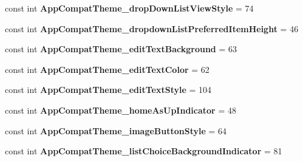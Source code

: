 \begin{DoxyCompactItemize}
\mbox{\label{class_sample_app_1_1_droid_1_1_resource_1_1_styleable_a871f78d9744c0ef783be14cd3319431d}} 
const int {\bfseries App\+Compat\+Theme\+\_\+drop\+Down\+List\+View\+Style} = 74
\item 
\mbox{\label{class_sample_app_1_1_droid_1_1_resource_1_1_styleable_aa779dd9c2f3264c4af6d77730baf8865}} 
const int {\bfseries App\+Compat\+Theme\+\_\+dropdown\+List\+Preferred\+Item\+Height} = 46
\item 
\mbox{\label{class_sample_app_1_1_droid_1_1_resource_1_1_styleable_a05c88570886a89a85a61f4e0fc1c652d}} 
const int {\bfseries App\+Compat\+Theme\+\_\+edit\+Text\+Background} = 63
\item 
\mbox{\label{class_sample_app_1_1_droid_1_1_resource_1_1_styleable_a76d7ae222d8833d4d2f528444636ac2f}} 
const int {\bfseries App\+Compat\+Theme\+\_\+edit\+Text\+Color} = 62
\item 
\mbox{\label{class_sample_app_1_1_droid_1_1_resource_1_1_styleable_a9ee466e662c1b42f11fc27147d27e43a}} 
const int {\bfseries App\+Compat\+Theme\+\_\+edit\+Text\+Style} = 104
\item 
\mbox{\label{class_sample_app_1_1_droid_1_1_resource_1_1_styleable_a3a4bc74cda96eb0b7eebc14f9dc7ce4d}} 
const int {\bfseries App\+Compat\+Theme\+\_\+home\+As\+Up\+Indicator} = 48
\item 
\mbox{\label{class_sample_app_1_1_droid_1_1_resource_1_1_styleable_a3bb8ccfa13f3aa006eab7428f0b615d6}} 
const int {\bfseries App\+Compat\+Theme\+\_\+image\+Button\+Style} = 64
\item 
\mbox{\label{class_sample_app_1_1_droid_1_1_resource_1_1_styleable_a2f8b9211138e6287f5a0288f22b112a3}} 
const int {\bfseries App\+Compat\+Theme\+\_\+list\+Choice\+Background\+Indicator} = 81
\item 

\end{DoxyCompactItemize}
